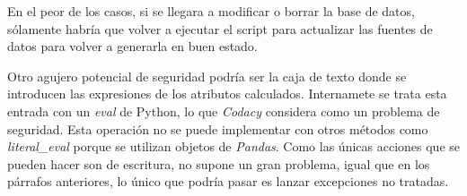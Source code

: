 En el peor de los casos, si se llegara a modificar o borrar la base de datos, sólamente habría que volver a ejecutar el script para actualizar las fuentes de datos para volver a generarla en buen estado.

Otro agujero potencial de seguridad podría ser la caja de texto donde se introducen las expresiones de los atributos calculados. Internamete se trata esta entrada con un \textit{eval} de Python, lo que \textit{Codacy} considera como un problema de seguridad. Esta operación no se puede implementar con otros métodos como \textit{literal\_eval} porque se utilizan objetos de \textit{Pandas}. Como las únicas acciones que se pueden hacer son de escritura, no supone un gran problema, igual que en los párrafos anteriores, lo único que podría pasar es lanzar excepciones no tratadas.
